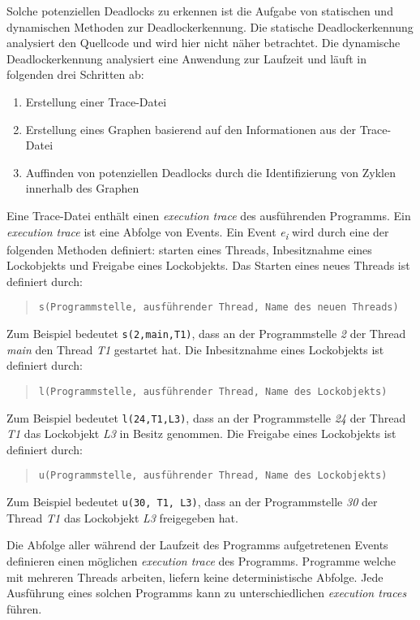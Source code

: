 Solche potenziellen Deadlocks zu erkennen ist die Aufgabe von statischen und
dynamischen Methoden zur Deadlockerkennung. Die statische Deadlockerkennung
analysiert den Quellcode und wird hier nicht näher betrachtet. Die dynamische
Deadlockerkennung analysiert eine Anwendung zur Laufzeit und läuft in folgenden
drei Schritten ab:
\begin{enumerate}
  \item Erstellung einer Trace-Datei
  \item Erstellung eines Graphen basierend auf den Informationen aus der
  Trace-Datei
  \item Auffinden von potenziellen Deadlocks durch die Identifizierung von Zyklen
  innerhalb des Graphen
\end{enumerate}

Eine Trace-Datei enthält einen \textit{execution trace} des ausführenden
Programms. Ein \textit{execution trace} ist eine Abfolge von Events. Ein Event
\textit{e\textsubscript{i}} wird durch eine der folgenden Methoden definiert:
starten eines Threads, Inbesitznahme eines Lockobjekts und Freigabe eines
Lockobjekts. Das Starten eines neues Threads ist definiert durch:
\begin{quote}
\texttt{s(Programmstelle, ausführender Thread, Name des neuen Threads)}
\end{quote}
Zum Beispiel bedeutet \texttt{s(2,main,T1)}, dass an der Programmstelle
\textit{2} der Thread \textit{main} den Thread \textit{T1} gestartet hat. 
Die Inbesitznahme eines Lockobjekts ist definiert durch:
\begin{quote}
\texttt{l(Programmstelle, ausführender Thread, Name des Lockobjekts)}
\end{quote}
Zum Beispiel bedeutet \texttt{l(24,T1,L3)}, dass
an der Programmstelle \textit{24} der Thread \textit{T1} das Lockobjekt
\textit{L3} in Besitz genommen. Die Freigabe eines Lockobjekts ist definiert
durch:
\begin{quote}
\texttt{u(Programmstelle, ausführender Thread, Name des Lockobjekts)}
\end{quote}
Zum Beispiel bedeutet \texttt{u(30, T1, L3)}, dass an der Programmstelle
\textit{30} der Thread \textit{T1} das Lockobjekt \textit{L3} freigegeben hat.

Die Abfolge aller während der Laufzeit des Programms aufgetretenen Events
definieren einen möglichen \textit{execution trace} des Programms.
Programme welche mit mehreren Threads arbeiten, liefern keine deterministische
Abfolge. Jede Ausführung eines solchen Programms kann zu
unterschiedlichen \textit{execution traces} führen. 

